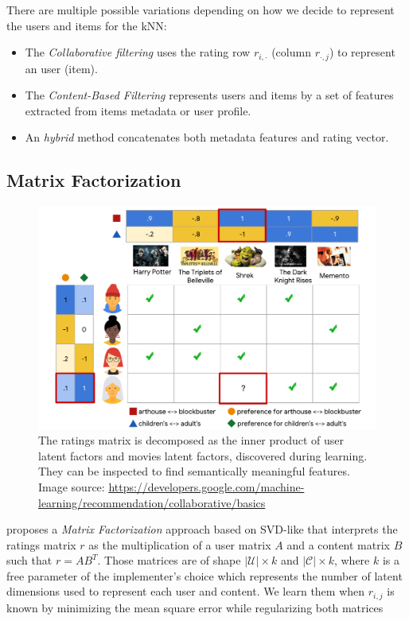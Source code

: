 There are multiple possible variations depending on how we decide to represent the users and items for the kNN:

\begin{itemize}
    \item The \emph{Collaborative filtering} uses the rating row $r_{i,\cdot}$ (column $r_{\cdot, j}$) to represent an user (item).
    \item The \emph{Content-Based Filtering} represents users and items by a set of features extracted from items metadata or user profile.
    \item An \emph{hybrid} method concatenates both metadata features and rating vector.
\end{itemize}

\subsection{Matrix Factorization}

\begin{figure}
    \centering
    \includegraphics[scale=0.5]{70-files/matrix-factorization.pdf}
    \caption{The ratings matrix is decomposed as the inner product of user latent factors and movies latent factors, discovered during learning. They can be inspected to find semantically meaningful features. Image source: \url{https://developers.google.com/machine-learning/recommendation/collaborative/basics}}
    \label{fig:matrixfactorization}
\end{figure}

\citet{funkmf} proposes a \emph{Matrix Factorization} approach based on \ac{SVD}-like that interprets the ratings matrix $r$ as the multiplication of a user matrix $A$ and a content matrix $B$ such that $r=AB^T$. Those matrices are of shape $|\mathcal{U}|\times k$ and $|\mathcal{C}| \times k$, where $k$ is a free parameter of the implementer's choice which represents the number of latent dimensions used to represent each user and content. We learn them when $r_{i,j}$ is known by minimizing the mean square error while regularizing both matrices

